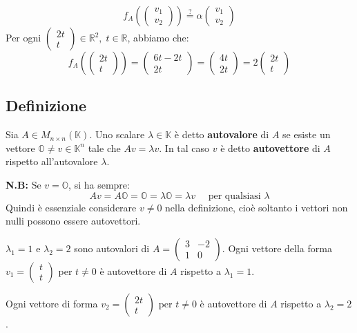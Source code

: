 \documentclass[a4paper]{article}
\theoremstyle{break}
\theoremstyle{break}
\theoremstyle{break}
\theoremstyle{break}
\begin{document}
\begin{example}
  \[
    f_A \left( \begin{pmatrix} v_1\\v_2 \end{pmatrix}  \right) \stackrel{?}{=}
    \alpha \begin{pmatrix} 
      v_1\\
      v_2
    \end{pmatrix} 
  \] 
  Per ogni \( \begin{pmatrix} 2t\\t \end{pmatrix} \in \mathbb{R}^2,\; t \in \mathbb{R} \),
  abbiamo che:
  \[
  f_A \left( \begin{pmatrix} 2t\\t \end{pmatrix}  \right) =
  \begin{pmatrix} 
    6t - 2t\\
    2t
  \end{pmatrix} 
  =
  \begin{pmatrix} 
    4t\\
    2t
  \end{pmatrix} 
  =
  2 \begin{pmatrix} 
    2t\\
    t
  \end{pmatrix} 
  \] 
\end{example}

\subsection{Definizione}
Sia \( A \in M_{n \times n}(\mathbb{K}) \). Uno scalare \( \lambda \in \mathbb{K} \) è
detto \textbf{autovalore} di \( A \) se esiste un vettore \( \mathbb{O} \neq v \in \mathbb{K}^n \) 
tale che \( Av = \lambda v \). In tal caso \( v \) è detto \textbf{autovettore} di \( A \)
rispetto all'autovalore \( \lambda \).

\noindent \textbf{N.B:} Se \( v = \mathbb{O} \), si ha sempre:
\[
Av = A\mathbb{O} = \mathbb{O} = \lambda \mathbb{O} = \lambda v \quad \text{ per qualsiasi } \lambda
\] 
Quindi è essenziale considerare \( v \neq 0 \) nella definizione, cioè soltanto
i vettori non nulli possono essere autovettori.

\begin{example}
  \( \lambda_1 = 1 \) e \( \lambda_2 = 2 \) sono autovalori di \( A = \begin{pmatrix} 
    3 & -2\\
    1 & 0
  \end{pmatrix}  \). Ogni vettore della forma \( v_1 = \begin{pmatrix} t\\t \end{pmatrix}  \) 
  per \( t \neq 0 \) è autovettore di \( A \) rispetto a \( \lambda_1 = 1 \).

  \noindent Ogni vettore di forma \( v_2 = \begin{pmatrix} 2t\\t \end{pmatrix}  \) per
  \( t \neq 0 \) è autovettore di \( A \) rispetto a \( \lambda_2 = 2 \).
\end{example}
\end{document}
